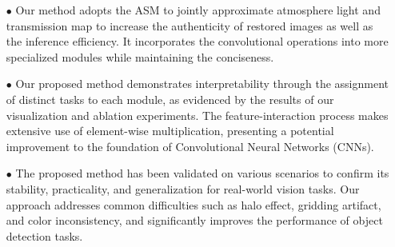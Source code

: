 \documentclass[lettersize,journal]{IEEEtran}
\begin{document}
\begin{itemize}
    \item[$\bullet$] Our method adopts the ASM to jointly approximate atmosphere light and transmission map to increase the authenticity of restored images as well as the inference efficiency. It incorporates the convolutional operations into more specialized modules while maintaining the conciseness.    
    \item[$\bullet$] Our proposed method demonstrates interpretability through the assignment of distinct tasks to each module, as evidenced by the results of our visualization and ablation experiments. The feature-interaction process makes extensive use of element-wise multiplication, presenting a potential improvement to the foundation of Convolutional Neural Networks (CNNs).
    \item[$\bullet$] The proposed method has been validated on various scenarios to confirm its stability, practicality, and generalization for real-world vision tasks. Our approach addresses common difficulties such as halo effect, gridding artifact, and color inconsistency, and significantly improves the performance of object detection tasks.
\end{itemize}
\end{document}
